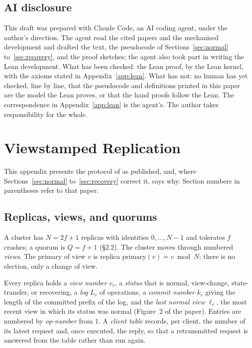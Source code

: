 \documentclass[11pt,a4paper]{article}
\theoremstyle{plain}
\theoremstyle{definition}
\theoremstyle{remark}
\newcommand{\primary}{\mathrm{primary}}
\begin{document}
\subsection*{AI disclosure}
This draft was prepared with Claude Code, an AI coding agent, under the
author's direction. The agent read the cited papers and the mechanised
development and drafted the text, the pseudocode of
Sections~\ref{sec:normal} to~\ref{sec:recovery}, and the proof sketches;
the agent also took part in writing the Lean development. What has been
checked: the Lean proof, by the Lean kernel, with the axioms stated in
Appendix~\ref{app:lean}. What has not: no human has yet checked, line by line, that the
pseudocode and definitions printed in this paper are the model the Lean
proves, or that the hand proofs follow the Lean. The correspondence in
Appendix~\ref{app:lean} is the agent's. The author takes responsibility
for the whole.



\appendix

\section{Viewstamped Replication}
\label{app:vr}

This appendix presents the protocol of \citet{liskov2012vr} as
published, and, where Sections~\ref{sec:normal} to~\ref{sec:recovery} correct it, says
why. Section numbers in parentheses refer to that paper.

\subsection{Replicas, views, and quorums}
\label{app:replicas}

A cluster has $N = 2f+1$ replicas with identities $0, \dots, N-1$ and
tolerates $f$ crashes; a quorum is $Q = f+1$ (\S2.2). The cluster moves
through numbered \emph{views}. The primary of view $v$ is replica
$\primary(v) = v \bmod N$; there is no election, only a change of view.

Every replica holds a \emph{view number} $v_r$, a \emph{status} that is
normal, view-change, state-transfer, or recovering, a \emph{log} $L_r$ of
operations, a \emph{commit number} $k_r$ giving the length of the
committed prefix of the log, and the \emph{last normal view} $\ell_r$,
the most recent view in which its status was normal (Figure~2 of the
paper). Entries are numbered by \emph{op-number} from $1$. A \emph{client table} records, per client, the number of its
latest request and, once executed, the reply, so that a retransmitted
request is answered from the table rather than run again.
\end{document}
